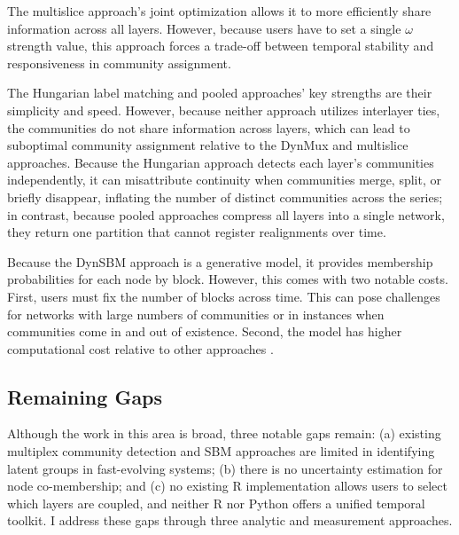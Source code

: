 \documentclass[11pt, letterpaper]{article}
\begin{document}
The multislice approach's joint optimization allows it to more efficiently share information across all layers. However, because users have to set a single $\omega$ strength value, this approach forces a trade-off between temporal stability and responsiveness in community assignment.

The Hungarian label matching and pooled approaches' key strengths are their simplicity and speed. However, because neither approach utilizes interlayer ties, the communities do not share information across layers, which can lead to suboptimal community assignment relative to the DynMux and multislice approaches. Because the Hungarian approach detects each layer's communities independently, it can misattribute continuity when communities merge, split, or briefly disappear, inflating the number of distinct communities across the series; in contrast, because pooled approaches compress all layers into a single network, they return one partition that cannot register realignments over time.

Because the DynSBM approach is a generative model, it provides membership probabilities for each node by block. However, this comes with two notable costs. First, users must fix the number of blocks across time. This can pose challenges for networks with large numbers of communities or in instances when communities come in and out of existence. Second, the model has higher computational cost relative to other approaches \citep{matias2017statistical}.

\subsection{Remaining Gaps}
Although the work in this area is broad, three notable gaps remain: (a) existing multiplex community detection and SBM approaches are limited in identifying latent groups in fast-evolving systems; (b) there is no uncertainty estimation for node co-membership; and (c) no existing R implementation allows users to select which layers are coupled, and neither R nor Python offers a unified temporal toolkit. I address these gaps through three analytic and measurement approaches.
\end{document}
